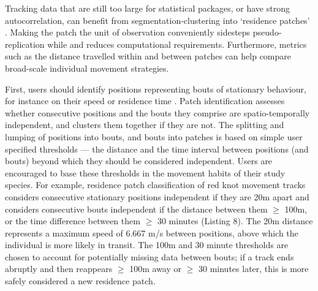 \documentclass[10pt,paper=a4,headings=standardclasses
]{scrartcl}
\begin{document}
Tracking data that are still too large for statistical packages, or have strong autocorrelation, can benefit from segmentation-clustering into `residence patches' \citep{bijleveld2016, oudman2018, barraquand2008}.
Making the patch the unit of observation conveniently sidesteps pseudo-replication while and reduces computational requirements.
Furthermore, metrics such as the distance travelled within and between patches can help compare broad-scale individual movement strategies.

First, users should identify positions representing bouts of stationary behaviour, for instance on their speed or residence time \citep{bracis2018}.
Patch identification assesses whether consecutive positions and the bouts they comprise are spatio-temporally independent, and clusters them together if they are not.
The splitting and lumping of positions into bouts, and bouts into patches is based on simple user specified thresholds --- the distance and the time interval between positions (and bouts) beyond which they should be considered independent.
Users are encouraged to base these thresholds in the movement habits of their study species.
For example, residence patch classification of red knot movement tracks considers consecutive stationary positions independent if they are 20m apart and considers consecutive bouts independent if the distance between them $\geq$ 100m, or the time difference between them $\geq$ 30 minutes (Listing 8).
The 20m distance represents a maximum speed of 6.667 m/s between positions, above which the individual is more likely in transit.
The 100m and 30 minute thresholds are chosen to account for potentially missing data between bouts; if a track ends abruptly and then reappears $\geq$ 100m away or $\geq$ 30 minutes later, this is more safely considered a new residence patch.
\end{document}
